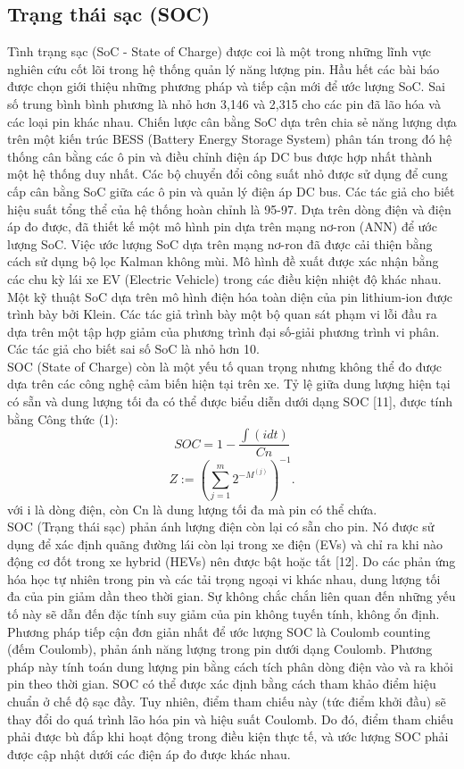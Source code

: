 \documentclass[a4paper,13pt]{article}
\theoremstyle{mytheor}
\begin{document}
\subsection{Trạng thái sạc (SOC)}
Tình trạng sạc (SoC - State of Charge) được coi là một trong những lĩnh vực nghiên cứu cốt lõi trong hệ thống quản lý năng lượng pin. Hầu hết các bài báo được chọn giới thiệu những phương pháp và tiếp cận mới để ước lượng SoC. Sai số trung bình bình phương là nhỏ hơn 3,146 và 2,315 cho các pin đã lão hóa và các loại pin khác nhau. Chiến lược cân bằng SoC dựa trên chia sẻ năng lượng dựa trên một kiến trúc BESS (Battery Energy Storage System) phân tán trong đó hệ thống cân bằng các ô pin và điều chỉnh điện áp DC bus được hợp nhất thành một hệ thống duy nhất. Các bộ chuyển đổi công suất nhỏ được sử dụng để cung cấp cân bằng SoC giữa các ô pin và quản lý điện áp DC bus. Các tác giả cho biết hiệu suất tổng thể của hệ thống hoàn chỉnh là 95-97. Dựa trên dòng điện và điện áp đo được, đã thiết kế một mô hình pin dựa trên mạng nơ-ron (ANN) để ước lượng SoC. Việc ước lượng SoC dựa trên mạng nơ-ron đã được cải thiện bằng cách sử dụng bộ lọc Kalman không mùi. Mô hình đề xuất được xác nhận bằng các chu kỳ lái xe EV (Electric Vehicle) trong các điều kiện nhiệt độ khác nhau. Một kỹ thuật SoC dựa trên mô hình điện hóa toàn diện của pin lithium-ion được trình bày bởi Klein. Các tác giả trình bày một bộ quan sát phạm vi lỗi đầu ra dựa trên một tập hợp giảm của phương trình đại số-giải phương trình vi phân. Các tác giả cho biết sai số SoC là nhỏ hơn 10.\\

SOC (State of Charge) còn là một yếu tố quan trọng nhưng không thể đo được dựa trên các công nghệ cảm biến hiện tại trên xe. Tỷ lệ giữa dung lượng hiện tại có sẵn và dung lượng tối đa có thể được biểu diễn dưới dạng SOC [11], được tính bằng Công thức (1):\\
\[SOC = 1 - \frac{\int(idt)}{Cn}\]
\[Z := (\sum_{j=1}^{m} 2^{-M^{(j)}})^{-1}.\]
với i là dòng điện, còn Cn là dung lượng tối đa mà pin có thể chứa. \\

SOC (Trạng thái sạc) phản ánh lượng điện còn lại có sẵn cho pin. Nó được sử dụng để xác định quãng đường lái còn lại trong xe điện (EVs) và chỉ ra khi nào động cơ đốt trong xe hybrid (HEVs) nên được bật hoặc tắt [12]. Do các phản ứng hóa học tự nhiên trong pin và các tải trọng ngoại vi khác nhau, dung lượng tối đa của pin giảm dần theo thời gian. Sự không chắc chắn liên quan đến những yếu tố này sẽ dẫn đến đặc tính suy giảm của pin không tuyến tính, không ổn định. Phương pháp tiếp cận đơn giản nhất để ước lượng SOC là Coulomb counting (đếm Coulomb), phản ánh năng lượng trong pin dưới dạng Coulomb. Phương pháp này tính toán dung lượng pin bằng cách tích phân dòng điện vào và ra khỏi pin theo thời gian. SOC có thể được xác định bằng cách tham khảo điểm hiệu chuẩn ở chế độ sạc đầy. Tuy nhiên, điểm tham chiếu này (tức điểm khởi đầu) sẽ thay đổi do quá trình lão hóa pin và hiệu suất Coulomb. Do đó, điểm tham chiếu phải được bù đắp khi hoạt động trong điều kiện thực tế, và ước lượng SOC phải được cập nhật dưới các điện áp đo được khác nhau.
\end{document}
